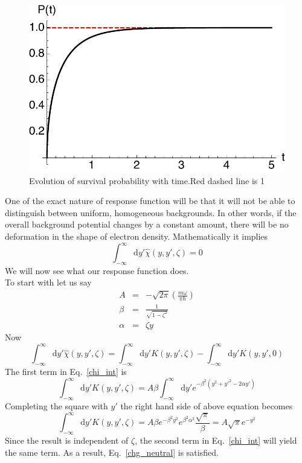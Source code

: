 \documentclass{article}
\newcommand{\eq}{\begin{equation}}
\newcommand{\qe}{\end{equation}}
\newcommand{\diff}{\mathrm{d}}
\begin{document}
\begin{figure}[H]
\begin{center}
 \includegraphics[scale=0.7]{plots/Survivalprobability.pdf}
\caption{Evolution of survival probability with time.Red dashed line is 1}
\end{center}
\end{figure}
One of the exact nature of response function will be that it will not be able to distinguish between uniform, homogeneous backgrounds. In other words, if the overall background potential changes by a constant amount, there will be no deformation in the shape of electron density. Mathematically it implies 
\eq\label{chg_neutral}
\int_{-\infty}^{\infty} \diff y' \hat{\chi}(y, y', \zeta) = 0
\qe
We will now see what our response function does.\\
To start with let us say
\begin{eqnarray}
A &=& -\sqrt{2\pi} \left( \frac{m \omega}{\pi \hbar}\right) \\
\beta &=& \frac{1}{\sqrt{1-\zeta^2}} \\
\alpha &=& \zeta y
\end{eqnarray}
Now
\eq\label{chi_int}
\int_{-\infty}^{\infty} \diff y' \hat{\chi}(y, y', \zeta) =\int_{-\infty}^{\infty} \diff y' K(y, y', \zeta) -\int_{-\infty}^{\infty} \diff y' K(y, y', 0) 
\qe
The first term in Eq.~\eqref{chi_int} is 
\eq
\int_{-\infty}^{\infty} \diff y' K(y, y', \zeta) = A \beta \int_{-\infty}^{\infty} \diff y' e^{-\beta^2(y^2+{y'}^2- 2\alpha y')} 
\qe
Completing the square with $y'$ the right hand side of above equation becomes 
\eq
\int_{-\infty}^{\infty} \diff y' K(y, y', \zeta) = A \beta  e^{-\beta^2 y^2} e^{\beta^2 \alpha^2}\frac{\sqrt{\pi}}{\beta}=A\sqrt{\pi} e^{-{y}^2}
\qe
Since the result is independent of $\zeta$, the second term in Eq.~\eqref{chi_int} will yield the same term. As a result, Eq.~\eqref{chg_neutral} is satisfied. 
\end{document}
